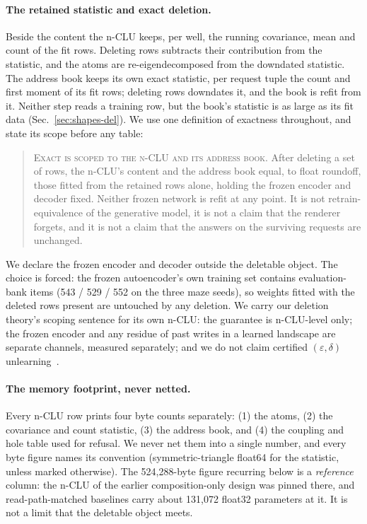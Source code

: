 \documentclass{article} %
\begin{document}
\paragraph{The retained statistic and exact deletion.} Beside the content the n-CLU keeps, per
well, the running covariance, mean and count of the fit rows. Deleting rows subtracts their
contribution from the statistic, and the atoms are re-eigendecomposed from the downdated
statistic. The address book keeps its own exact statistic, per request tuple the count and first
moment of its fit rows; deleting rows downdates it, and the book is refit from it. Neither step
reads a training row, but the book's statistic is as large as its fit data
(Sec.~\ref{sec:shapes-del}). We use one definition of exactness throughout, and state its scope
before any table:

\begin{quote}\small
\textsc{Exact is scoped to the n-CLU and its address book.} After deleting a set of rows, the n-CLU's
content and the address book equal, to float roundoff, those fitted from the retained rows alone,
holding the frozen encoder and decoder fixed. Neither frozen network is refit at any point. It is
not retrain-equivalence of the generative model, it is not a claim that the renderer forgets, and it
is not a claim that the answers on the surviving requests are unchanged.
\end{quote}

\noindent We declare the frozen encoder and decoder outside the deletable object. The choice
is forced: the frozen autoencoder's own training set contains evaluation-bank items
(543 / 529 / 552 on the three maze seeds), so weights fitted with the deleted rows present are untouched by any deletion. %
We carry our deletion theory's scoping sentence for its own n-CLU: the guarantee
is n-CLU-level only; the frozen encoder and any residue of past writes in a learned
landscape are separate channels, measured separately; and we do not claim certified
$(\varepsilon,\delta)$ unlearning~\citep{guo2020certified}. %



\paragraph{The memory footprint, never netted.} Every n-CLU row prints four byte counts
separately: (1) the atoms, (2) the covariance and count statistic, (3) the address book, and
(4) the coupling and hole table used for refusal.
We never net them into a single number, and every byte figure names its convention
(symmetric-triangle float64 for the statistic, unless marked otherwise). The 524,288-byte figure
recurring below is a \emph{reference} column: the n-CLU of the earlier composition-only design
was pinned there, and read-path-matched baselines carry about 131,072 float32 parameters at it. %
It is not a limit that the deletable object meets.
\end{document}
